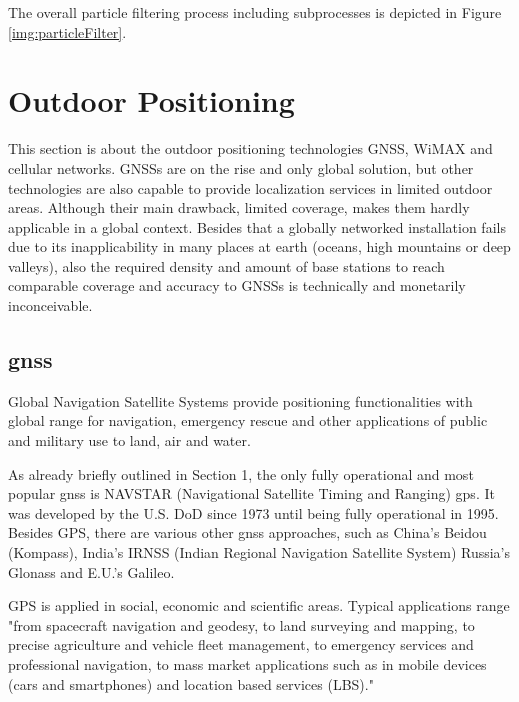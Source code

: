 The overall particle filtering process including subprocesses is depicted in Figure \ref{img:particleFilter}.


\newpage


\section{Outdoor Positioning}
This section is about the outdoor positioning technologies GNSS, WiMAX and cellular networks. GNSSs are on the rise and only global solution, but other technologies are also capable to provide localization services in limited outdoor areas. Although their main drawback, limited coverage, makes them hardly applicable in a global context.
Besides that a globally networked installation fails due to its inapplicability in many places at earth (oceans, high mountains or deep valleys), also the required density and amount of base stations to reach comparable coverage and accuracy to GNSSs is technically and monetarily inconceivable.


\subsection*{\ac{gnss}}

Global Navigation Satellite Systems provide positioning functionalities with global range for navigation, emergency rescue and other applications of public and military use to land, air and water.

As already briefly outlined in Section 1, the only fully operational and most popular \ac{gnss} is NAVSTAR (Navigational Satellite Timing and Ranging) \ac{gps}. It was developed by the U.S. DoD since 1973 until being fully operational in 1995. 
Besides GPS, there are various other \ac{gnss} approaches, such as China's Beidou (Kompass), India's IRNSS (Indian Regional Navigation Satellite System) Russia's Glonass and E.U.'s Galileo. \cite{heiseOnlineGPS}


GPS is applied in social, economic and scientific areas. Typical applications range "from spacecraft navigation and geodesy, to land surveying and mapping, to precise agriculture and vehicle fleet management, to emergency services and professional navigation, to mass market applications such as in mobile devices (cars and smartphones) and location based services (LBS)."\cite{liRizos}

